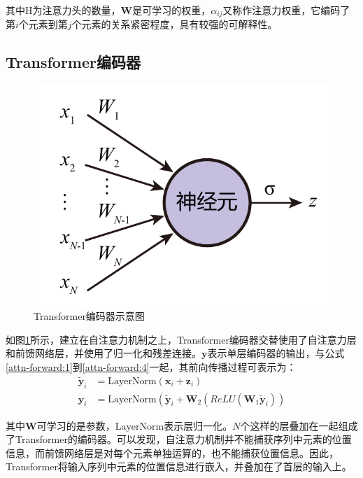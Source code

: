 其中H为注意力头的数量，$\bm{W}$是可学习的权重，$\alpha_{ij}$又称作注意力权重，它编码了第$i$个元素到第$j$个元素的关系紧密程度，具有较强的可解释性。

\subsection{Transformer编码器}

\begin{figure}[]
    \centering
    \includegraphics[page=5]{figure/figures.pdf}
    \caption{Transformer编码器示意图\cite{attn17}}
    \label{trans-enc}
\end{figure}

如图\ref{trans-enc}所示，建立在自注意力机制之上，Transformer编码器交替使用了自注意力层和前馈网络层，并使用了归一化和残差连接。$\bm{y}$表示单层编码器的输出，与公式\ref{attn-forward:1}到\ref{attn-forward:4}一起，其前向传播过程可表示为：
\def\LN{\mathrm{LayerNorm}}
\begin{align}
{\widetilde{\bm{y}}}_i&=\LN\left(\bm{x}_i+\bm{z}_i\right)\\
\bm{y}_i&=\LN\left({\widetilde{\bm{y}}}_i+\bm{W}_2\left(ReLU\left(\bm{W}_1{\widetilde{\bm{y}}}_i\right)\right)\right.
\end{align}

其中$\bm{W}$可学习的是参数，$\LN$表示层归一化\cite{LayerN16}。$N$个这样的层叠加在一起组成了Transformer的编码器。可以发现，自注意力机制并不能捕获序列中元素的位置信息，而前馈网络层是对每个元素单独运算的，也不能捕获位置信息。因此，Transformer将输入序列中元素的位置信息进行嵌入，并叠加在了首层的输入上。

